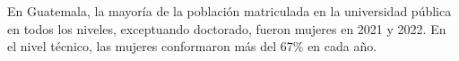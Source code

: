 En Guatemala, la mayoría de la población matriculada en la universidad pública en todos los niveles, exceptuando doctorado, fueron mujeres en 2021 y 2022. En el nivel técnico, las mujeres conformaron más del 67\% en cada año. 